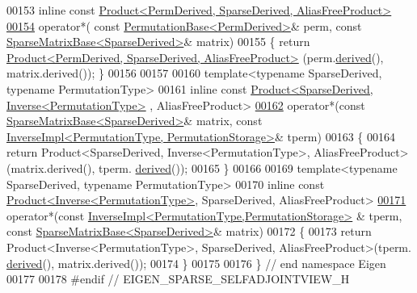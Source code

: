 \begin{DoxyCode}
00153 \textcolor{keyword}{inline} \textcolor{keyword}{const} \hyperlink{group___core___module_class_eigen_1_1_product}{Product<PermDerived, SparseDerived, AliasFreeProduct>}
\hyperlink{namespace_eigen_a9c2c1af8da495ae3cbe7be12cecfe294}{00154} operator*( \textcolor{keyword}{const} \hyperlink{group___core___module_class_eigen_1_1_permutation_base}{PermutationBase<PermDerived>}& perm, \textcolor{keyword}{const} 
      \hyperlink{group___sparse_core___module_class_eigen_1_1_sparse_matrix_base}{SparseMatrixBase<SparseDerived>}& matrix)
00155 \{ \textcolor{keywordflow}{return}  \hyperlink{group___core___module_class_eigen_1_1_product}{Product<PermDerived, SparseDerived, AliasFreeProduct>}
      (perm.\hyperlink{group___core___module_a324b16961a11d2ecfd2d1b7dd7946545}{derived}(), matrix.derived()); \}
00156 
00157 
00160 \textcolor{keyword}{template}<\textcolor{keyword}{typename} SparseDerived, \textcolor{keyword}{typename} PermutationType>
00161 \textcolor{keyword}{inline} \textcolor{keyword}{const} \hyperlink{group___core___module_class_eigen_1_1_product}{Product<SparseDerived, Inverse<PermutationType>}
      , AliasFreeProduct>
\hyperlink{namespace_eigen_ad6d3d00588ad602b9d64755ab14ac2f0}{00162} operator*(\textcolor{keyword}{const} \hyperlink{group___sparse_core___module_class_eigen_1_1_sparse_matrix_base}{SparseMatrixBase<SparseDerived>}& matrix, \textcolor{keyword}{const} 
      \hyperlink{class_eigen_1_1_inverse_impl_3_01_permutation_type_00_01_permutation_storage_01_4}{InverseImpl<PermutationType, PermutationStorage>}& tperm)
00163 \{
00164   \textcolor{keywordflow}{return} Product<SparseDerived, Inverse<PermutationType>, AliasFreeProduct>(matrix.derived(), tperm.
      \hyperlink{group___core___module_a324b16961a11d2ecfd2d1b7dd7946545}{derived}());
00165 \}
00166 
00169 \textcolor{keyword}{template}<\textcolor{keyword}{typename} SparseDerived, \textcolor{keyword}{typename} PermutationType>
00170 \textcolor{keyword}{inline} \textcolor{keyword}{const} \hyperlink{group___core___module_class_eigen_1_1_product}{Product<Inverse<PermutationType>}, SparseDerived, 
      AliasFreeProduct>
\hyperlink{namespace_eigen_a8908bda30ef10657db0653d96ad5800e}{00171} operator*(\textcolor{keyword}{const} \hyperlink{class_eigen_1_1_inverse_impl_3_01_permutation_type_00_01_permutation_storage_01_4}{InverseImpl<PermutationType,PermutationStorage>}
      & tperm, \textcolor{keyword}{const} \hyperlink{group___sparse_core___module_class_eigen_1_1_sparse_matrix_base}{SparseMatrixBase<SparseDerived>}& matrix)
00172 \{
00173   \textcolor{keywordflow}{return} Product<Inverse<PermutationType>, SparseDerived, AliasFreeProduct>(tperm.
      \hyperlink{group___core___module_a324b16961a11d2ecfd2d1b7dd7946545}{derived}(), matrix.derived());
00174 \}
00175 
00176 \} \textcolor{comment}{// end namespace Eigen}
00177 
00178 \textcolor{preprocessor}{#endif // EIGEN\_SPARSE\_SELFADJOINTVIEW\_H}
\end{DoxyCode}
